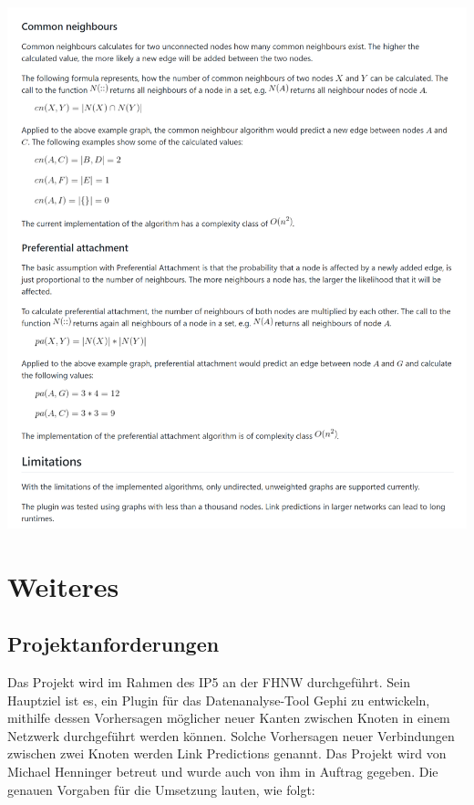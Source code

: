 \includegraphics[width=\textwidth]{resources/readme_pt3.png}

\chapter{Weiteres}

\section{Projektanforderungen}
\label{projektanforderungen}
Das Projekt wird im Rahmen des IP5 an der FHNW durchgeführt. Sein Hauptziel ist es, ein Plugin für das Datenanalyse-Tool Gephi zu entwickeln, mithilfe dessen Vorhersagen möglicher neuer Kanten zwischen Knoten in einem Netzwerk durchgeführt werden können. Solche Vorhersagen neuer Verbindungen zwischen zwei Knoten werden Link Predictions genannt. Das Projekt wird von Michael Henninger betreut und wurde auch von ihm in Auftrag gegeben.
Die genauen Vorgaben für die Umsetzung lauten, wie folgt:

